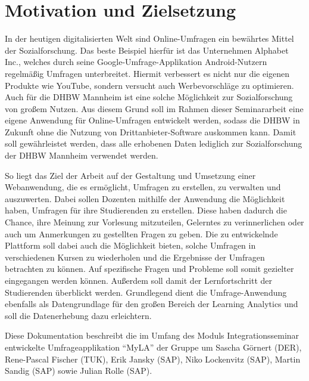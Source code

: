 \section{Motivation und Zielsetzung}

In der heutigen digitalisierten Welt sind Online-Umfragen ein bewährtes Mittel der Sozialforschung.
Das beste Beispiel hierfür ist das Unternehmen Alphabet Inc., welches durch seine Google-Umfrage-Applikation Android-Nutzern regelmäßig Umfragen unterbreitet.
Hiermit verbessert es nicht nur die eigenen Produkte wie YouTube, sondern versucht auch Werbevorschläge zu optimieren.
Auch für die \acs{DHBW} Mannheim ist eine solche Möglichkeit zur Sozialforschung von großem Nutzen.
Aus diesem Grund soll im Rahmen dieser Seminararbeit eine eigene Anwendung für Online-Umfragen entwickelt werden, sodass die \acs{DHBW} in Zukunft ohne die Nutzung von Drittanbieter-Software auskommen kann.
Damit soll gewährleistet werden, dass alle erhobenen Daten lediglich zur Sozialforschung der \acs{DHBW} Mannheim verwendet werden.

So liegt das Ziel der Arbeit auf der Gestaltung und Umsetzung einer Webanwendung, die es ermöglicht, Umfragen zu erstellen, zu verwalten und auszuwerten.
Dabei sollen Dozenten mithilfe der Anwendung die Möglichkeit haben, Umfragen für ihre Studierenden zu erstellen.
Diese haben dadurch die Chance, ihre Meinung zur Vorlesung mitzuteilen, Gelerntes zu verinnerlichen oder auch um Anmerkungen zu gestellten Fragen zu geben.
Die zu entwickelnde Plattform soll dabei auch die Möglichkeit bieten, solche Umfragen in verschiedenen Kursen zu wiederholen und die Ergebnisse der Umfragen betrachten zu können.
Auf spezifische Fragen und Probleme soll somit gezielter eingegangen werden können.
Außerdem soll damit der Lernfortschritt der Studierenden überblickt werden.
Grundlegend dient die Umfrage-Anwendung ebenfalls als Datengrundlage für den großen Bereich der Learning Analytics und soll die Datenerhebung dazu erleichtern.


Diese Dokumentation beschreibt die im Umfang des Moduls Integrationsseminar entwickelte Umfrageapplikation \enquote{MyLA} der Gruppe um Sascha Görnert (DER), Rene-Pascal Fischer (TUK), Erik Jansky (SAP), Niko Lockenvitz (SAP), Martin Sandig (SAP) sowie Julian Rolle (SAP).
